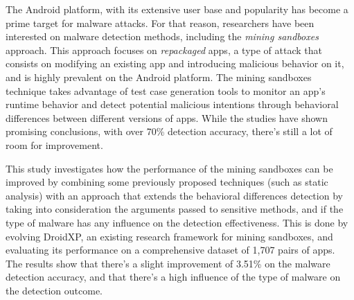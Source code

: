 The Android platform, with its extensive user base and popularity has become a prime target for malware attacks. For that reason, researchers have been interested on malware detection methods, including the \textit{mining sandboxes} approach. This approach focuses on  \textit{repackaged} apps, a type of attack that consists on modifying an existing app and introducing malicious behavior on it, and is highly prevalent on the Android platform. The mining sandboxes technique takes advantage of test case generation tools to monitor an app's runtime behavior and detect potential malicious intentions through behavioral differences between different versions of apps. While the studies have shown promising conclusions, with over 70\% detection accuracy, there's still a lot of room for improvement.

This study investigates how the performance of the mining sandboxes can be improved by combining some previously proposed techniques (such as static analysis) with an approach that extends the behavioral differences detection by taking into consideration the arguments passed to sensitive methods, and if the type of malware has any influence on the detection effectiveness. This is done by evolving DroidXP, an existing research framework for mining sandboxes, and evaluating its performance on a comprehensive dataset of 1,707 pairs of apps. The results show that there's a slight improvement of 3.51\% on the malware detection accuracy, and that there's a high influence of the type of malware on the detection outcome.